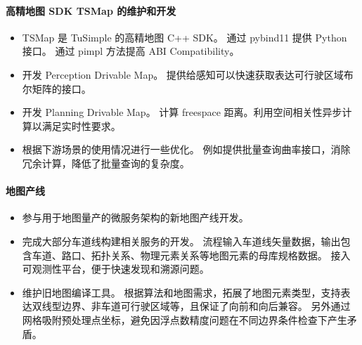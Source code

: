 
\paragraph{高精地图 SDK TSMap 的维护和开发}
\begin{itemize}
      \item TSMap 是 TuSimple 的高精地图 C++ SDK。
            通过 pybind11 提供 Python 接口。
            通过 pimpl 方法提高 ABI Compatibility。
      \item 开发 Perception Drivable Map。
            提供给感知可以快速获取表达可行驶区域布尔矩阵的接口。
      \item 开发 Planning Drivable Map。
            计算 freespace 距离。利用空间相关性异步计算以满足实时性要求。
      \item 根据下游场景的使用情况进行一些优化。
            例如提供批量查询曲率接口，消除冗余计算，降低了批量查询的复杂度。
\end{itemize}

\paragraph{地图产线}
\begin{itemize}
      \item 参与用于地图量产的微服务架构的新地图产线开发。
      \item 完成大部分车道线构建相关服务的开发。
            流程输入车道线矢量数据，输出包含车道、路口、拓扑关系、物理元素关系等地图元素的母库规格数据。
            接入可观测性平台，便于快速发现和溯源问题。
      \item 维护旧地图编译工具。
            根据算法和地图需求，拓展了地图元素类型，支持表达双线型边界、非车道可行驶区域等，且保证了向前和向后兼容。
            另外通过网格吸附预处理点坐标，避免因浮点数精度问题在不同边界条件检查下产生矛盾。
\end{itemize}


